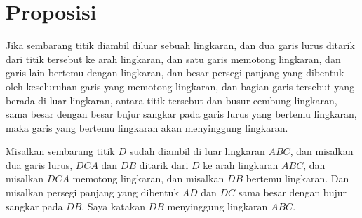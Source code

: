 \documentclass[a4paper]{book}
\begin{document}
\section*{\centering Proposisi \thesection}
Jika sembarang titik diambil diluar sebuah lingkaran, dan dua garis lurus
ditarik dari titik tersebut ke arah lingkaran, dan satu garis memotong 
lingkaran, dan garis lain bertemu dengan lingkaran, 
dan besar 
persegi panjang yang dibentuk oleh keseluruhan garis yang memotong 
lingkaran, dan bagian garis tersebut yang berada di luar lingkaran, antara
titik tersebut dan busur cembung lingkaran, sama besar dengan besar bujur 
sangkar pada garis lurus yang bertemu lingkaran, maka garis yang bertemu
lingkaran akan menyinggung lingkaran.

\begin{center}
\end{center}

Misalkan sembarang titik $D$ sudah diambil di luar lingkaran $ABC$, dan 
misalkan dua garis lurus, $DCA$ dan $DB$ ditarik dari $D$ ke arah lingkaran
$ABC$, dan misalkan $DCA$ memotong lingkaran, dan misalkan $DB$ bertemu
lingkaran. Dan misalkan persegi panjang yang dibentuk $AD$ dan $DC$ sama
besar dengan bujur sangkar pada $DB$. Saya katakan $DB$ menyinggung 
lingkaran $ABC$.
\end{document}
